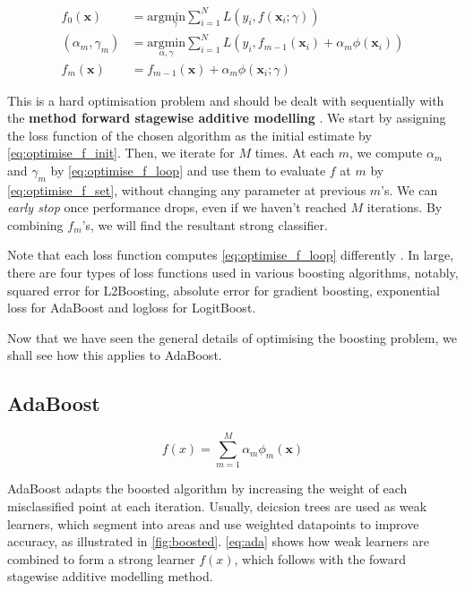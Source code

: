 \begin{align}
  f_0(\mathbf{x}) &= \mathrm{arg} \underset{\gamma}{\mathrm{min}} \sum_{i=1}^{N} L(y_i,f(\mathbf{x}_i ; \gamma)) \label{eq:optimise_f_init}
  \\
  (\alpha_m,\gamma_m) &= \underset{\alpha,\gamma}{\mathrm{argmin}} \sum_{i=1}^{N} L(y_i, f_{m-1}(\mathbf{x}_i) + \alpha_m\phi(\mathbf{x}_i)) \label{eq:optimise_f_loop}
  \\
  f_m(\mathbf{x}) &= f_{m-1}(\mathbf{x}) + \alpha_m\phi(\mathbf{x}_i;\gamma) \label{eq:optimise_f_set}
\end{align}

This is a hard optimisation problem and should be dealt with sequentially with the \textbf{method forward stagewise additive modelling} \cite{mur-book}. We start by assigning the loss function of the chosen algorithm as the initial estimate by \autoref{eq:optimise_f_init}. Then, we iterate for $M$ times. At each $m$, we compute $\alpha_m$ and $\gamma_m$ by \autoref{eq:optimise_f_loop} and use them to evaluate $f$ at $m$ by \autoref{eq:optimise_f_set}, without changing any parameter at previous $m$'s. We can \textit{early stop} once performance drops, even if we haven't reached $M$ iterations. By combining $f_m$'s, we will find the resultant strong classifier. 

Note that each loss function computes \autoref{eq:optimise_f_loop} differently \cite{mur-book}. In large, there are four types of loss functions used in various boosting algorithms, notably, squared error for L2Boosting, absolute error for gradient boosting, exponential loss for AdaBoost and logloss for LogitBoost.

Now that we have seen the general details of optimising the boosting problem, we shall see how this applies to AdaBoost. 


\subsection{AdaBoost}

\begin{equation} \label{eq:ada}
  f(x) = \sum_{m=1}^{M} \alpha_m \phi_m (\mathbf{x})
\end{equation}

AdaBoost adapts the boosted algorithm by increasing the weight of each misclassified point at each iteration. Usually, deicsion trees are used as weak learners, which segment into areas and use weighted datapoints to improve accuracy, as illustrated in \autoref{fig:boosted}. \autoref{eq:ada} shows how weak learners are combined to form a strong learner $f(x)$, which follows with the foward stagewise additive modelling method.

